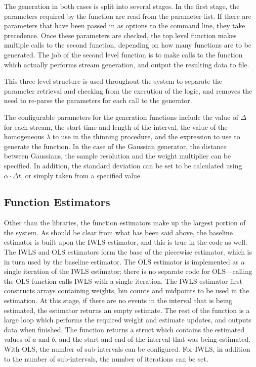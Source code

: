 \documentclass[a4paper,11pt]{article}
\begin{document}
   The generation in both cases is split into several stages. In the first
   stage, the parameters required by the function are read from the parameter
   list. If there are parameters that have been passed in as options to the
   command line, they take precedence. Once these parameters are checked, the
   top level function makes multiple calls to the second function, depending on
   how many functions are to be generated. The job of the second level function
   is to make calls to the function which actually performs stream generation,
   and output the resulting data to file.

   This three-level structure is used throughout the system to separate the
   parameter retrieval and checking from the execution of the logic, and removes
   the need to re-parse the parameters for each call to the generator.

   The configurable parameters for the generation functions include the value
   of $\Delta$ for each stream, the start time and length of the interval, the
   value of the homogeneous $\lambda$ to use in the thinning procedure, and the
   expression to use to generate the function. In the case of the Gaussian
   generator, the distance between Gaussians, the sample resolution and the
   weight multiplier can be specified. In addition, the standard deviation can
   be set to be calculated using $\alpha\cdot\Delta t$, or simply taken from a
   specified value.
\subsection{Function Estimators}
\label{sec-6-7}

   Other than the libraries, the function estimators make up the largest portion
   of the system. As should be clear from what has been said above, the baseline
   estimator is built upon the IWLS estimator, and this is true in the code as
   well. The IWLS and OLS estimators form the base of the piecewise estimator,
   which is in turn used by the baseline estimator. The OLS estimator is
   implemented as a single iteration of the IWLS estimator; there is no separate
   code for OLS---calling the OLS function calls IWLS with a single
   iteration. The IWLS estimator first constructs arrays containing weights, bin
   counts and midpoints to be used in the estimation. At this stage, if there
   are no events in the interval that is being estimated, the estimator returns
   an empty estimate. The rest of the function is a large loop which performs
   the required weight and estimate updates, and outputs data when finished. The
   function returns a struct which contains the estimated values of $a$ and $b$,
   and the start and end of the interval that was being estimated. With OLS, the
   number of sub-intervals can be configured. For IWLS, in addition to the
   number of sub-intervals, the number of iterations can be set.
\end{document}
